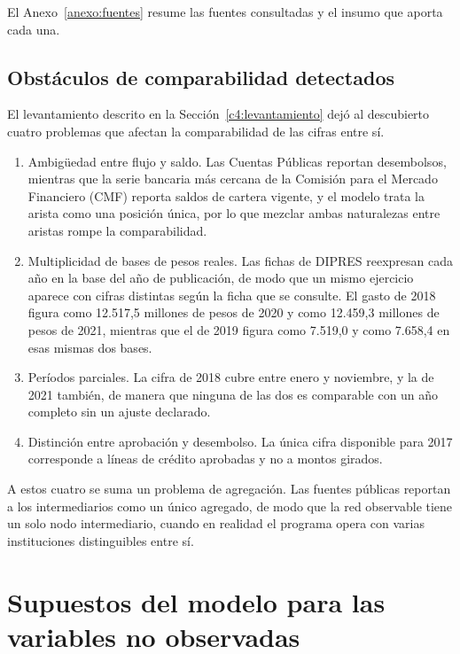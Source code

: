 El Anexo~\ref{anexo:fuentes} resume las fuentes consultadas y el insumo que aporta cada una.

\subsection{Obstáculos de comparabilidad detectados}
\label{c3:obstaculos}

El levantamiento descrito en la Sección~\ref{c4:levantamiento} dejó al descubierto cuatro problemas que afectan la comparabilidad de las cifras entre sí.

\begin{enumerate}
    \item Ambigüedad entre flujo y saldo. Las Cuentas Públicas reportan
    desembolsos, mientras que la serie bancaria más cercana de la Comisión para el Mercado Financiero (CMF) reporta
    saldos de cartera vigente, y el modelo trata la arista como una posición
    única, por lo que mezclar ambas naturalezas entre aristas rompe la
    comparabilidad.
    \item Multiplicidad de bases de pesos reales. Las fichas de DIPRES reexpresan
    cada año en la base del año de publicación, de modo que un mismo ejercicio
    aparece con cifras distintas según la ficha que se consulte. El gasto de 2018
    figura como 12.517,5 millones de pesos de 2020 y como 12.459,3 millones de
    pesos de 2021, mientras que el de 2019 figura como 7.519,0 y como 7.658,4 en
    esas mismas dos bases.
    \item Períodos parciales. La cifra de 2018 cubre entre enero y noviembre, y
    la de 2021 también, de manera que ninguna de las dos es comparable con un año
    completo sin un ajuste declarado.
    \item Distinción entre aprobación y desembolso. La única cifra disponible
    para 2017 corresponde a líneas de crédito aprobadas y no a montos girados.
\end{enumerate}

A estos cuatro se suma un problema de agregación. Las fuentes públicas reportan a los intermediarios como un único agregado, de modo que la red observable tiene un solo nodo intermediario, cuando en realidad el programa opera con varias instituciones distinguibles entre sí.

\section{Supuestos del modelo para las variables no observadas}
\label{c3:supuestos}


